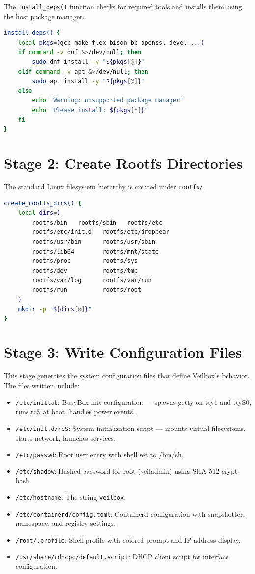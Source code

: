 The \texttt{install\_deps()} function checks for required tools and
installs them using the host package manager.

\begin{lstlisting}[language=bash]
install_deps() {
    local pkgs=(gcc make flex bison bc openssl-devel ...)
    if command -v dnf &>/dev/null; then
        sudo dnf install -y "${pkgs[@]}"
    elif command -v apt &>/dev/null; then
        sudo apt install -y "${pkgs[@]}"
    else
        echo "Warning: unsupported package manager"
        echo "Please install: ${pkgs[*]}"
    fi
}
\end{lstlisting}

\section{Stage 2: Create Rootfs Directories}

The standard Linux filesystem hierarchy is created under \texttt{rootfs/}.

\begin{lstlisting}[language=bash]
create_rootfs_dirs() {
    local dirs=(
        rootfs/bin   rootfs/sbin   rootfs/etc
        rootfs/etc/init.d   rootfs/etc/dropbear
        rootfs/usr/bin      rootfs/usr/sbin
        rootfs/lib64        rootfs/mnt/state
        rootfs/proc         rootfs/sys
        rootfs/dev          rootfs/tmp
        rootfs/var/log      rootfs/var/run
        rootfs/run          rootfs/root
    )
    mkdir -p "${dirs[@]}"
}
\end{lstlisting}

\section{Stage 3: Write Configuration Files}

This stage generates the system configuration files that define Veilbox's
behavior. The files written include:

\begin{itemize}[nosep]
  \item \texttt{/etc/inittab}: BusyBox init configuration — spawns getty
        on tty1 and ttyS0, runs rcS at boot, handles power events.
  \item \texttt{/etc/init.d/rcS}: System initialization script — mounts
        virtual filesystems, starts network, launches services.
  \item \texttt{/etc/passwd}: Root user entry with shell set to /bin/sh.
  \item \texttt{/etc/shadow}: Hashed password for root (veiladmin) using
        SHA-512 crypt hash.
  \item \texttt{/etc/hostname}: The string \texttt{veilbox}.
  \item \texttt{/etc/containerd/config.toml}: Containerd configuration
        with snapshotter, namespace, and registry settings.
  \item \texttt{/root/.profile}: Shell profile with colored prompt and
        IP address display.
  \item \texttt{/usr/share/udhcpc/default.script}: DHCP client script
        for interface configuration.
\end{itemize}

